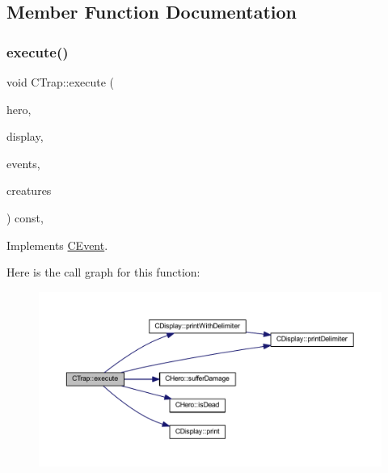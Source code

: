 \subsection{Member Function Documentation}
\mbox{\label{class_c_trap_a0b0925310ffbfa28f877ac5669f8bb20}} 
\subsubsection{\texorpdfstring{execute()}{execute()}}
{\footnotesize\ttfamily void C\+Trap\+::execute (\begin{DoxyParamCaption}\item[{\mbox{\hyperlink{class_c_hero}{C\+Hero}} \&}]{hero,  }\item[{const \mbox{\hyperlink{class_c_display}{C\+Display}} \&}]{display,  }\item[{const std\+::map$<$ int, const \mbox{\hyperlink{class_c_event}{C\+Event}} $\ast$$>$ \&}]{events,  }\item[{const std\+::map$<$ int, const \mbox{\hyperlink{class_c_creature}{C\+Creature}} $\ast$$>$ \&}]{creatures }\end{DoxyParamCaption}) const\hspace{0.3cm}{\ttfamily [override]}, {\ttfamily [virtual]}}



Implements \mbox{\hyperlink{class_c_event_a46bd2925f7f19c5c0d6adf2b1e6e3f70}{C\+Event}}.

Here is the call graph for this function\+:\nopagebreak
\begin{figure}[H]
\begin{center}
\leavevmode
\includegraphics[width=350pt]{class_c_trap_a0b0925310ffbfa28f877ac5669f8bb20_cgraph}
\end{center}
\end{figure}
\mbox{\label{class_c_trap_a64aba41bb1f7578d10e347358273acf4}} 
